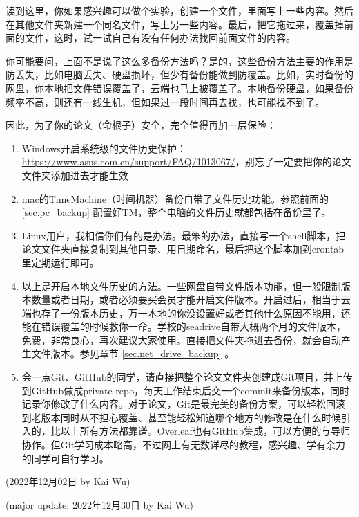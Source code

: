 读到这里，你如果感兴趣可以做个实验，创建一个文件，里面写上一些内容。然后在其他文件夹新建一个同名文件，写上另一些内容。最后，把它拖过来，覆盖掉前面的文件，这时，试一试自己有没有任何办法找回前面文件的内容。

你可能要问，上面不是说了这么多备份方法吗？是的，这些备份方法主要的作用是防丢失，比如电脑丢失、硬盘损坏，但少有备份能做到防覆盖。比如，实时备份的网盘，你本地把文件错误覆盖了，云端也马上被覆盖了。本地备份硬盘，如果备份频率不高，则还有一线生机，但如果过一段时间再去找，也可能找不到了。

因此，为了你的论文（命根子）安全，完全值得再加一层保险：

\begin{enumerate}
    \item Windows开启系统级的文件历史保护：\url{https://www.asus.com.cn/support/FAQ/1013067/}，别忘了一定要把你的论文文件夹添加进去才能生效
    \item mac的TimeMachine（时间机器）备份自带了文件历史功能。参照前面的 \ref{sec.pc_backup} 配置好TM，整个电脑的文件历史就都包括在备份里了。
    \item Linux用户，我相信你们有的是办法。最笨的办法，直接写一个shell脚本，把论文文件夹直接复制到其他目录、用日期命名，最后把这个脚本加到crontab里定期运行即可。
    \item 以上是开启本地文件历史的方法。一些网盘自带文件版本功能，但一般限制版本数量或者日期，或者必须要买会员才能开启文件版本。开启过后，相当于云端也存了一份版本历史，万一本地的你没设置好或者其他什么原因不能用，还能在错误覆盖的时候救你一命。学校的seadrive自带大概两个月的文件版本，免费，非常良心，再次建议大家使用。直接把文件夹拖进去备份，就会自动产生文件版本。参见章节 \ref{sec.net_drive_backup} 。
    \item 会一点Git、GitHub的同学，请直接把整个论文文件夹创建成Git项目，并上传到GitHub做成private repo，每天工作结束后交一个commit来备份版本，同时记录你修改了什么内容。对于论文，Git是最完美的备份方案，可以轻松回滚到老版本同时从不担心覆盖、甚至能轻松知道哪个地方的修改是在什么时候引入的，比以上所有方法都靠谱。Overleaf也有GitHub集成，可以方便的与导师协作。但Git学习成本略高，不过网上有无数详尽的教程，感兴趣、学有余力的同学可自行学习。
\end{enumerate}


\begin{flushright}
(2022年12月02日 by Kai Wu)

(major update: 2022年12月30日 by Kai Wu)
\end{flushright}





% 
